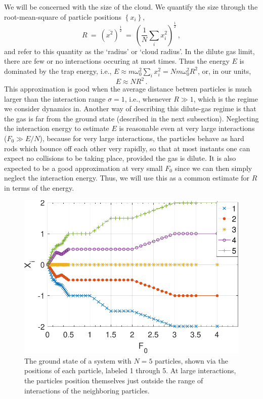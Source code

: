 \documentclass[a4paper, onecolumn]{revtex4-1}
\begin{document}
We will be concerned with the size of the cloud.  We quantify the size through the root-mean-square
of particle positions $\left\lbrace x_i\right\rbrace$, 
\begin{equation}
R ~=~ \left(\overline{x^2}\right)^\frac{1}{2} ~=~ \left(\frac{1}{N}\sum_i{x_i^2}\right)^\frac{1}{2} \, ,
\label{eq:def_of_R}
\end{equation}
and refer to this quantity as the `radius' or `cloud radius'.
%
In the dilute gas limit, there are few or no interactions occuring at most times.  Thus the energy
$E$ is dominated by the trap energy, i.e., $E\approx m\omega_0^2\sum_{i}x_i^2= Nm\omega_0^2R^2$, or,
in our units,
\begin{equation}
  E\approx NR^2 \, .
  \label{eq:E_and_R}
\end{equation}
%
This approximation is good when the average distance betwen particles is much larger than the
interaction range $\sigma=1$, i.e., whenever $R\gg1$, which is the regime we consider dynamics in.
Another way of describing this dilute-gas regime is that the gas is far from the ground state
(described in the next subsection).  Neglecting the interaction energy to estimate $E$ is reasonable
even at very large interactions ($F_0\gg E/N$), because for very large interactions, the particles
behave as hard rods which bounce off each other very rapidly, so that at most instants one can
expect no collisions to be taking place, provided the gas is dilute.  It is also expected to be a
good approximation at very small $F_0$ since we can then simply neglect the interaction energy.
Thus, we will use this as a common estimate for $R$ in terms of the energy.


\begin{figure}[tbhp]
\centering
\includegraphics[scale=0.65]{ZhiyuPictures/N_5_GS_pre_2_rev-crop.pdf}
\caption{The ground state of a system with $N=5$ particles, shown via the positions of each
  particle, labeled 1 through 5.  At large interactions, the particles position themselves just
  outside the range of interactions of the neighboring particles.}
\label{fig:GS1}
\end{figure}
\end{document}
